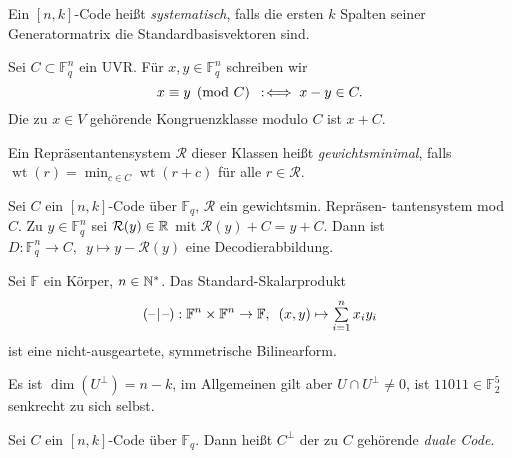 \documentclass{cheat-sheet}
\newcommand{\F}{\mathbb{F}} %
\DeclareMathOperator{\wt}{wt} %
\newcommand{\scp}[2]{\left( #1 \!\mid\! #2 \right)} %
\begin{document}
\begin{defn}
  Ein $[n,k]$-Code heißt \emph{systematisch}, falls die ersten $k$ Spalten seiner Generatormatrix die Standardbasisvektoren sind.
\end{defn}


\begin{nota}
  Sei $C \subset \F_q^n$ ein UVR. Für $x, y \in \F_q^n$ schreiben wir
  \[ x \equiv y \pmod{C} \enspace:\!\iff x-y \in C. \]
  Die zu $x \in V$ gehörende Kongruenzklasse modulo $C$ ist $x + C$.
\end{nota}

\begin{defn}
  Ein Repräsentantensystem $\mathcal{R}$ dieser Klassen heißt \emph{gewichtsminimal}, falls $\wt(r) = \min_{c \in C} \wt(r+c)$ für alle $r \in \mathcal{R}$.
\end{defn}

\begin{satz}
  Sei $C$ ein $[n, k]$-Code über $\F_q$, $\mathcal{R}$ ein gewichtsmin. Repräsen- tantensystem mod $C$.
  Zu $y \in \F_q^n$ sei $\mathcal{R}(y) \in \mathbb{R}$ mit $\mathcal{R}(y) + C = y + C$.
  Dann ist $D : \F_q^n \to C, \enspace y \mapsto y - \mathcal{R}(y)$ eine Decodierabbildung.
\end{satz}




\begin{bem}
  Sei $\F$ ein Körper, $n \in \mathbb{N}^*$.
  Das Standard-Skalarprodukt
  \[
    \scp{\blank}{\blank} : \F^n \times \F^n \to \F,
    \enspace (x, y) \mapsto \sum_{i=1}^n x_i y_i
  \]
  ist eine nicht-ausgeartete, symmetrische Bilinearform.
\end{bem}


\begin{acht}
  Es ist $\dim(U^\perp) = n - k$, im Allgemeinen gilt aber $U \cap U^\perp \neq 0$, \zB{} ist $11011 \in \F_2^5$ senkrecht zu sich selbst.
\end{acht}

\begin{defn}
  Sei $C$ ein $[n,k]$-Code über $\F_q$.
  Dann heißt $C^\perp$ der zu $C$ gehörende \emph{duale Code}.
\end{defn}
\end{document}
